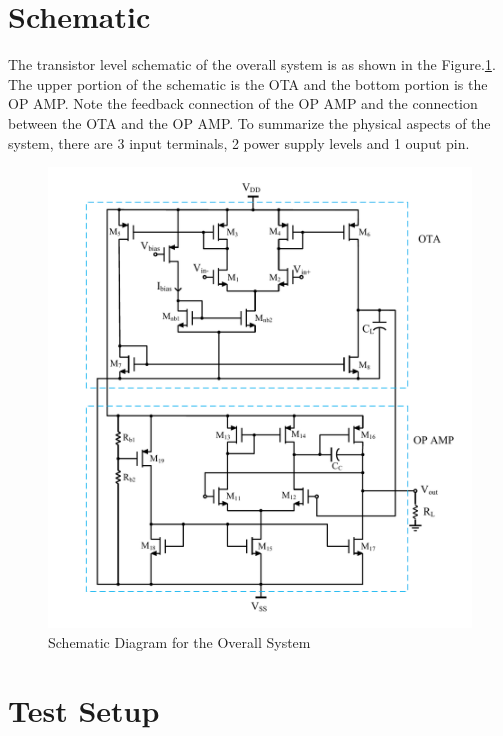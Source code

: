 \section{Schematic}
The transistor level schematic of the overall system is as shown in the Figure.\ref{fig:System_Schematic}. The upper portion of the schematic is the OTA and the bottom portion is the OP AMP. Note the feedback connection of the OP AMP and the connection between the OTA and the OP AMP. To summarize the physical aspects of the system, there are 3 input terminals, 2 power supply levels and 1 ouput pin.
 
\begin{figure} [H]
\centering
\includegraphics[scale=1]{Figures/Schematics/OTA_OPAMP_Schematic_RL.pdf}
\caption{Schematic Diagram for the Overall System}
\label{fig:System_Schematic}
\end{figure}

\section{Test Setup}


